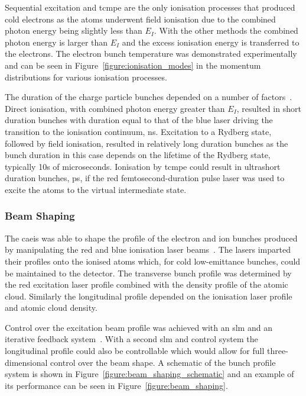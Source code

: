 Sequential excitation and \gls{tcmpe} are the only ionisation processes that produced cold electrons as the atoms underwent field ionisation due to the combined photon energy being slightly less than $E_I$.
With the other methods the combined photon energy is larger than $E_I$ and the excess ionisation energy is transferred to the electrons.
The electron bunch temperature was demonstrated experimentally~\cite{speirs_identification_2017} and can be seen in Figure~\ref{figure:ionisation_modes} in the momentum distributions for various ionisation processes.

The duration of the charge particle bunches depended on a number of factors~\cite{speirs_identification_2017}.
Direct ionisation, with combined photon energy greater than $E_I$, resulted in short duration bunches with duration equal to that of the blue laser driving the transition to the ionisation continuum, \unit[5]{ns}.
Excitation to a Rydberg state, followed by field ionisation, resulted in relatively long duration bunches as the bunch duration in this case depends on the lifetime of the Rydberg state, typically 10s of microseconds.
Ionisation by \gls{tcmpe} could result in ultrashort duration bunches, \unit[10]{ps}, if the red femtosecond-duration pulse laser was used to excite the atoms to the virtual intermediate state.

\subsubsection{Beam Shaping}

The \gls{caeis} was able to shape the profile of the electron and ion bunches produced by manipulating the red and blue ionisation laser beams~\cite{mcculloch_arbitrarily_2011}.
The lasers imparted their profiles onto the ionised atoms which, for cold low-emittance bunches, could be maintained to the detector.
The transverse bunch profile was determined by the red excitation laser profile combined with the density profile of the atomic cloud.
Similarly the longitudinal profile depended on the ionisation laser profile and atomic cloud density.

Control over the excitation beam profile was achieved with an \gls{slm} and an iterative feedback system~\cite{van_bijnen_patterned_2015}.
With a second \gls{slm} and control system the longitudinal profile could also be controllable which would allow for full three-dimensional control over the beam shape.
A schematic of the bunch profile system is shown in Figure~\ref{figure:beam_shaping_schematic} and an example of its performance can be seen in Figure~\ref{figure:beam_shaping}.

